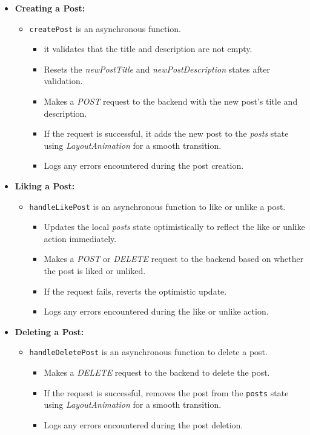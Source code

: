 \begin{itemize}
    \item \textbf{Creating a Post:}
    \begin{itemize}
        \item \texttt{createPost} is an asynchronous function.
        \begin{itemize}
            \item it validates that the title and description are not empty.
            \item Resets the \textit{newPostTitle} and \textit{newPostDescription} states after validation.
            \item Makes a \textit{POST} request to the backend with the new post's title and description.
            \item If the request is successful, it adds the new post to the \textit{posts} state using \textit{LayoutAnimation} for a smooth transition.
            \item Logs any errors encountered during the post creation.
        \end{itemize}
    \end{itemize}

    \item \textbf{Liking a Post:}
    \begin{itemize}
        \item \texttt{handleLikePost} is an asynchronous function to like or unlike a post.
        \begin{itemize}
            \item Updates the local \textit{posts} state optimistically to reflect the like or unlike action immediately.
            \item Makes a \textit{POST} or \textit{DELETE} request to the backend based on whether the post is liked or unliked.
            \item If the request fails, reverts the optimistic update.
            \item Logs any errors encountered during the like or unlike action.
        \end{itemize}
    \end{itemize}

    \item \textbf{Deleting a Post:}
    \begin{itemize}
        \item \texttt{handleDeletePost} is an asynchronous function to delete a post.
        \begin{itemize}
            \item Makes a \textit{DELETE} request to the backend to delete the post.
            \item If the request is successful, removes the post from the \texttt{posts} state using \textit{LayoutAnimation} for a smooth transition.
            \item Logs any errors encountered during the post deletion.
        \end{itemize}
    \end{itemize}


\end{itemize}
